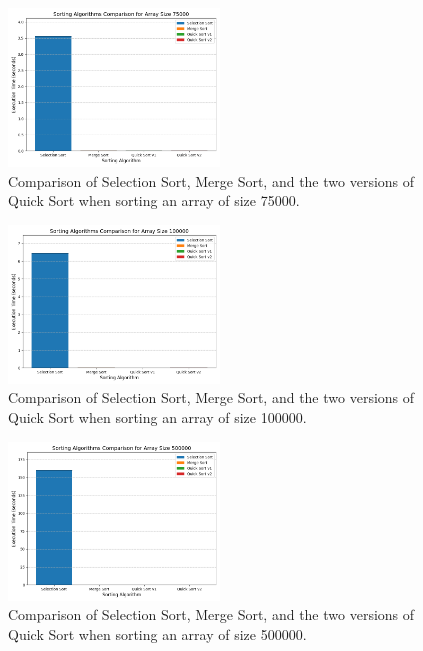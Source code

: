 \documentclass[12pt, letterpaper]{report}
\begin{document}
\begin{figure}[htbp]
    \centering
    \includegraphics[width=0.5\textwidth]{"../img/b_Figure_8.png"}
    \caption{Comparison of Selection Sort, Merge Sort, and the two versions of Quick Sort when sorting an array of size 75000.}
    \label{fig:image8}
\end{figure}

\begin{figure}[htbp]
    \centering
    \includegraphics[width=0.5\textwidth]{"../img/b_Figure_9.png"}
    \caption{Comparison of Selection Sort, Merge Sort, and the two versions of Quick Sort when sorting an array of size 100000.}
    \label{fig:image9}
\end{figure}

\begin{figure}[htbp]
    \centering
    \includegraphics[width=0.5\textwidth]{"../img/b_Figure_10.png"}
    \caption{Comparison of Selection Sort, Merge Sort, and the two versions of Quick Sort when sorting an array of size 500000.}
    \label{fig:image10}
\end{figure}
\end{document}
